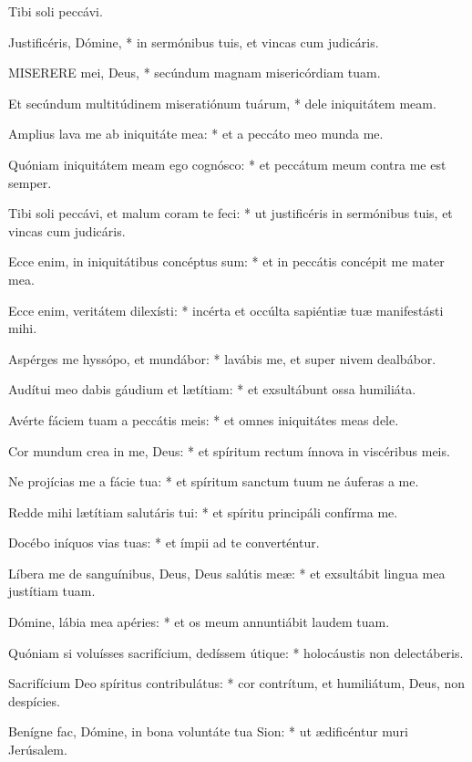  Tibi soli peccávi.


 Justificéris, Dómine, * in sermónibus tuis, et vincas cum judicáris.


\lettrine[lines=2]{M}{ISERERE} mei, Deus, * secúndum magnam misericórdiam tuam.

Et secúndum multitúdinem miseratiónum tuárum, * dele iniquitátem meam.

Amplius lava me ab iniquitáte mea: * et a peccáto meo munda me.

Quóniam iniquitátem meam ego cognósco: * et peccátum meum contra me est semper.

Tibi soli peccávi, et malum coram te feci: * ut justificéris in sermónibus tuis, et vincas cum judicáris.

Ecce enim, in iniquitátibus concéptus sum: * et in peccátis concépit me mater mea.

Ecce enim, veritátem dilexísti: * incérta et occúlta sapiéntiæ tuæ manifestásti mihi.

Aspérges me hyssópo, et mundábor: * lavábis me, et super nivem dealbábor.

Audítui meo dabis gáudium et lætítiam: * et exsultábunt ossa humiliáta.

Avérte fáciem tuam a peccátis meis: * et omnes iniquitátes meas dele.

Cor mundum crea in me, Deus: * et spíritum rectum ínnova in viscéribus meis.

Ne projícias me a fácie tua: * et spíritum sanctum tuum ne áuferas a me.

Redde mihi lætítiam salutáris tui: * et spíritu principáli confírma me.

Docébo iníquos vias tuas: * et ímpii ad te converténtur.

Líbera me de sanguínibus, Deus, Deus salútis meæ: * et exsultábit lingua mea justítiam tuam.

Dómine, lábia mea apéries: * et os meum annuntiábit laudem tuam.

Quóniam si voluísses sacrifícium, dedíssem útique: * holocáustis non delectáberis.

Sacrifícium Deo spíritus contribulátus: * cor contrítum, et humiliátum, Deus, non despícies.

Benígne fac, Dómine, in bona voluntáte tua Sion: * ut ædificéntur muri Jerúsalem.

